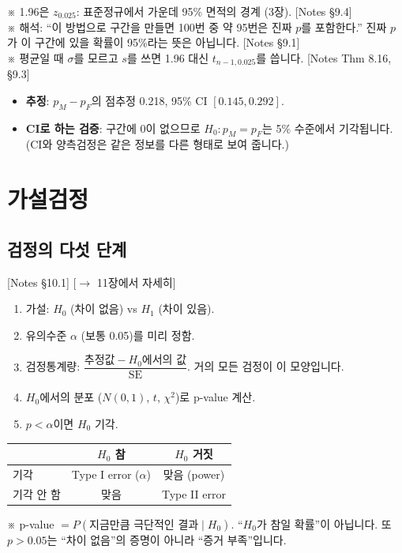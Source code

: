 \documentclass[11pt,a4paper]{article}
\newcommand{\SE}{\mathrm{SE}}
\newcommand{\nref}[1]{{\footnotesize\textsf{\color{blue!55!black}[Notes #1]}}}
\newcommand{\aside}[1]{{\footnotesize\color{black!65}#1}}
\newcommand{\fwd}[1]{{\footnotesize\textsf{\color{green!40!black}[$\to$ #1에서 자세히]}}}
\begin{document}
\aside{※ 1.96은 $z_{0.025}$: 표준정규에서 가운데 95\% 면적의 경계 (3장). \nref{§9.4}}\\
\aside{※ 해석: ``이 방법으로 구간을 만들면 100번 중 약 95번은 진짜 $p$를 포함한다.'' 진짜 $p$가 이 구간에 있을 확률이 95\%라는 뜻은 아닙니다. \nref{§9.1}}\\
\aside{※ 평균일 때 $\sigma$를 모르고 $s$를 쓰면 1.96 대신 $t_{n-1,0.025}$를 씁니다. \nref{Thm 8.16, §9.3}}

\begin{hypbox}
\begin{itemize}
\item \textbf{추정}: $p_M-p_F$의 점추정 0.218, 95\% CI $[0.145, 0.292]$.
\item \textbf{CI로 하는 검증}: 구간에 0이 없으므로 $H_0: p_M=p_F$는 5\% 수준에서 기각됩니다. (CI와 양측검정은 같은 정보를 다른 형태로 보여 줍니다.)
\end{itemize}
\end{hypbox}

\section{가설검정}

\subsection{검정의 다섯 단계} \nref{§10.1} \fwd{11장}
\begin{enumerate}
\item 가설: $H_0$ (차이 없음) vs $H_1$ (차이 있음).
\item 유의수준 $\alpha$ (보통 0.05)를 미리 정함.
\item 검정통계량: $\dfrac{\text{추정값}-H_0\text{에서의 값}}{\SE}$. 거의 모든 검정이 이 모양입니다.
\item $H_0$에서의 분포 ($N(0,1)$, $t$, $\chi^2$)로 p-value 계산.
\item $p<\alpha$이면 $H_0$ 기각.
\end{enumerate}
\begin{center}
\begin{tabular}{@{}l c c@{}}
\toprule
 & $H_0$ 참 & $H_0$ 거짓 \\
\midrule
기각 & Type I error ($\alpha$) & 맞음 (power) \\
기각 안 함 & 맞음 & Type II error \\
\bottomrule
\end{tabular}
\end{center}
\aside{※ p-value $=P(\text{지금만큼 극단적인 결과}\mid H_0)$. ``$H_0$가 참일 확률''이 아닙니다. 또 $p>0.05$는 ``차이 없음''의 증명이 아니라 ``증거 부족''입니다.}
\end{document}
